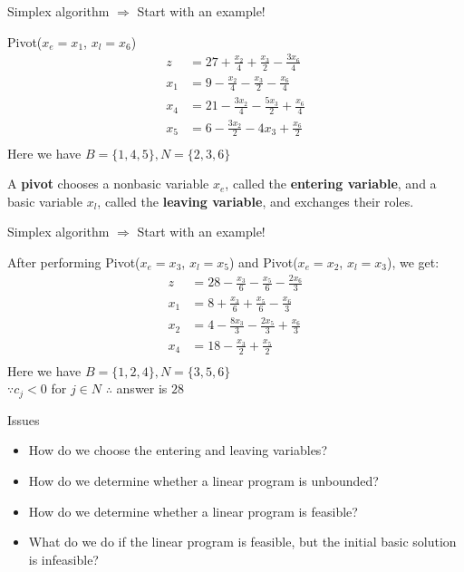 \begin{frame}{Simplex algorithm $\Rightarrow$ Start with an example!}

    \begin{block}{Pivot($x_e = x_1$, $x_l = x_6$)}
        \begin{align*}
            z   & = 27 + \frac{x_2}{4} + \frac{x_3}{2} - \frac{3x_6}{4}  \\
            x_1 & = 9 - \frac{x_2}{4} - \frac{x_3}{2} - \frac{x_6}{4}    \\
            x_4 & = 21 - \frac{3x_2}{4} - \frac{5x_3}{2} + \frac{x_6}{4} \\
            x_5 & = 6 - \frac{3x_2}{2} - 4x_3 + \frac{x_6}{2}            \\
        \end{align*}
        Here we have $B = \{1, 4, 5\}, N = \{2, 3, 6\}$
    \end{block}

    A \textbf{pivot} chooses a nonbasic variable $x_e$,
    called the \textbf{entering variable}, and a basic variable $x_l$,
    called the \textbf{leaving variable}, and exchanges their roles.

\end{frame}

\begin{frame}{Simplex algorithm $\Rightarrow$ Start with an example!}

    After performing Pivot($x_e = x_3$, $x_l = x_5$) 
    and Pivot($x_e = x_2$, $x_l = x_3$), we get:
    \begin{align*}
        z   & = 28 - \frac{x_3}{6} - \frac{x_5}{6} - \frac{2x_6}{3} \\
        x_1 & = 8 + \frac{x_3}{6} + \frac{x_5}{6} - \frac{x_6}{3}   \\
        x_2 & = 4 - \frac{8x_3}{3} - \frac{2x_5}{3} + \frac{x_6}{3} \\
        x_4 & = 18 - \frac{x_3}{2} + \frac{x_5}{2}                  \\
    \end{align*}
    Here we have $B = \{1, 2, 4\}, N = \{3, 5, 6\}$\\
    $\because c_j < 0$ for $j\in N$
    $\therefore$ answer is $28$

\end{frame}

\begin{frame}{Issues}

    \begin{itemize}
        \item How do we choose the entering and leaving variables?
        \item How do we determine whether a linear program is unbounded?
        \item How do we determine whether a linear program is feasible?
        \item What do we do if the linear program is feasible, 
        but the initial basic solution is infeasible?
    \end{itemize}

\end{frame}

